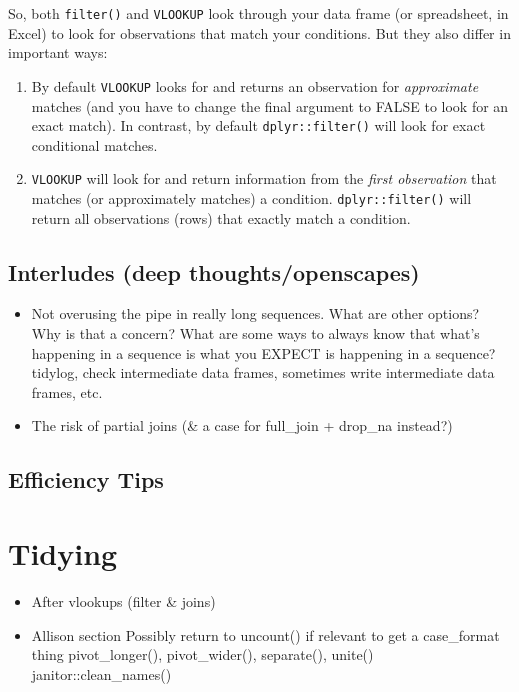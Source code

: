 \documentclass[]{book}
\providecommand{\tightlist}{%
  \setlength{\itemsep}{0pt}\setlength{\parskip}{0pt}}
\begin{document}
So, both \texttt{filter()} and \texttt{VLOOKUP} look through your data frame (or spreadsheet, in Excel) to look for observations that match your conditions. But they also differ in important ways:

\begin{enumerate}
\def\labelenumi{(\arabic{enumi})}
\item
  By default \texttt{VLOOKUP} looks for and returns an observation for \emph{approximate} matches (and you have to change the final argument to FALSE to look for an exact match). In contrast, by default \texttt{dplyr::filter()} will look for exact conditional matches.
\item
  \texttt{VLOOKUP} will look for and return information from the \emph{first observation} that matches (or approximately matches) a condition. \texttt{dplyr::filter()} will return all observations (rows) that exactly match a condition.
\end{enumerate}

\hypertarget{interludes-deep-thoughtsopenscapes-5}{%
\section{Interludes (deep thoughts/openscapes)}\label{interludes-deep-thoughtsopenscapes-5}}

\begin{itemize}
\item
  Not overusing the pipe in really long sequences. What are other options? Why is that a concern? What are some ways to always know that what's happening in a sequence is what you EXPECT is happening in a sequence? tidylog, check intermediate data frames, sometimes write intermediate data frames, etc.
\item
  The risk of partial joins (\& a case for full\_join + drop\_na instead?)
\end{itemize}

\hypertarget{efficiency-tips-6}{%
\section{Efficiency Tips}\label{efficiency-tips-6}}

\hypertarget{tidying}{%
\chapter{Tidying}\label{tidying}}

\begin{itemize}
\tightlist
\item
  After vlookups (filter \& joins)
\item
  Allison section
  Possibly return to uncount() if relevant to get a case\_format thing
  pivot\_longer(), pivot\_wider(), separate(), unite()
  janitor::clean\_names()
\end{itemize}
\end{document}
